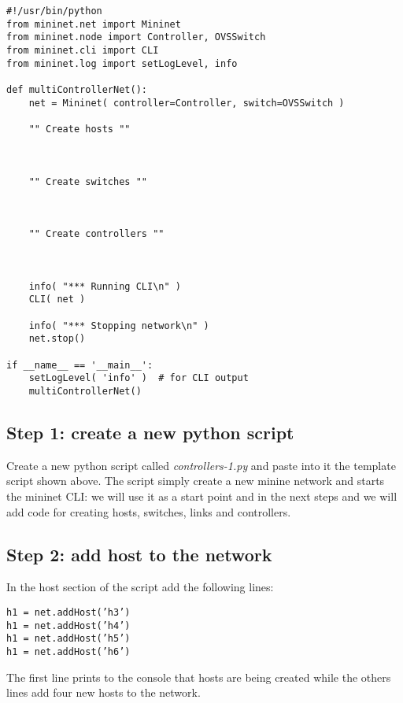 \documentclass[12pt, a4paper]{article}
\newcommand{\code}[1]{{\footnotesize\texttt{#1}}}
\begin{document}
\begin{minipage}{\linewidth}
\begin{lstlisting}
#!/usr/bin/python
from mininet.net import Mininet
from mininet.node import Controller, OVSSwitch
from mininet.cli import CLI
from mininet.log import setLogLevel, info

def multiControllerNet():
    net = Mininet( controller=Controller, switch=OVSSwitch )

    "" Create hosts ""



    "" Create switches ""



    "" Create controllers ""



    info( "*** Running CLI\n" )
    CLI( net )

    info( "*** Stopping network\n" )
    net.stop()

if __name__ == '__main__':
    setLogLevel( 'info' )  # for CLI output
    multiControllerNet()
\end{lstlisting}
\end{minipage}

\subsection*{Step 1: create a new python script}
Create a new python script called \emph{controllers-1.py} and paste into it the
template script shown above. The script simply create a new minine network
and starts the mininet CLI: we will use it as a start point and in the next steps
and we will add code for creating hosts, switches, links and controllers.



\subsection*{Step 2: add host to the network}
In the host section of the script add the following lines:

 \code{h1 = net.addHost('h3')} \\
 \code{h1 = net.addHost('h4')} \\
 \code{h1 = net.addHost('h5')} \\
 \code{h1 = net.addHost('h6')}

The first line prints to the console that hosts are being created while the others
lines add four new hosts to the network.
\end{document}
